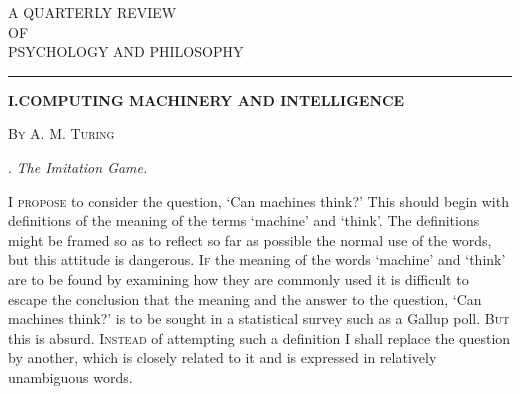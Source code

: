 \documentclass[10pt]{article} %
\newcommand{\articletitle}[1]{%
    \vspace*{0.7cm} %
    \begin{center}%
        {\normalfont\LARGE\textbf{\uppercase{#1}}}%
    \end{center}%
    \par\vspace{0.2cm}%
}
\newcommand{\articleauthor}[1]{%
    \begin{center}%
        {\normalfont\scshape #1}%
    \end{center}%
    \par\vspace{0.5cm}%
}
\begin{document}
\thispagestyle{firstpage} %


\vspace*{1.2cm} %
\begin{center}
    {\Huge\textbf{}}
\end{center}

\vspace*{0.5cm} %
\begin{center}
    {\large A QUARTERLY REVIEW} \\
    \vspace{0.1cm} %
    {\normalsize OF} \\
    \vspace{0.1cm} %
    {\large PSYCHOLOGY AND PHILOSOPHY}
\end{center}

\vspace*{0.5cm} %
\begin{center}
    \rule{3cm}{0.75pt} %
\end{center}
\vspace*{0.7cm} %

\articletitle{I.\textemdash COMPUTING MACHINERY AND INTELLIGENCE} %
\articleauthor{\textsc{By A. M. Turing}}

\noindent{}. \textit{The Imitation Game.}
\vspace{0.5\baselineskip} %

I \textsc{propose} to consider the question, `Can machines think?' This should begin with definitions of the meaning of the terms `machine' and `think'. The definitions might be framed so as to reflect so far as possible the normal use of the words, but this attitude is dangerous. \textsc{If} the meaning of the words `machine' and `think' are to be found by examining how they are commonly used it is difficult to escape the conclusion that the meaning and the answer to the question, `Can machines think?' is to be sought in a statistical survey such as a Gallup poll. \textsc{But} this is absurd. \textsc{Instead} of attempting such a definition \textsc{I} shall replace the question by another, which is closely related to it and is expressed in relatively unambiguous words.
\end{document}

